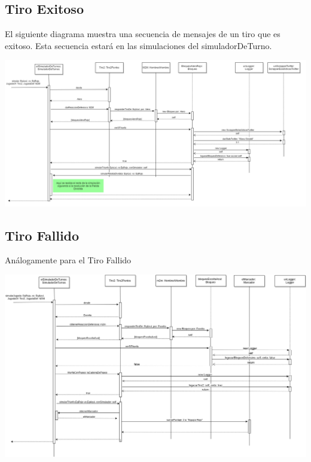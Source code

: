 \subsection{Tiro Exitoso}

El siguiente diagrama muestra una secuencia de mensajes de un tiro que es exitoso. Esta secuencia estará en las simulaciones del simuladorDeTurno.

\includegraphics[width=\textwidth]{imgs/TiroExitoso.png}

\subsection{Tiro Fallido}

Análogamente para el Tiro Fallido

\includegraphics[width=\textwidth]{imgs/TiroFallido.png}

